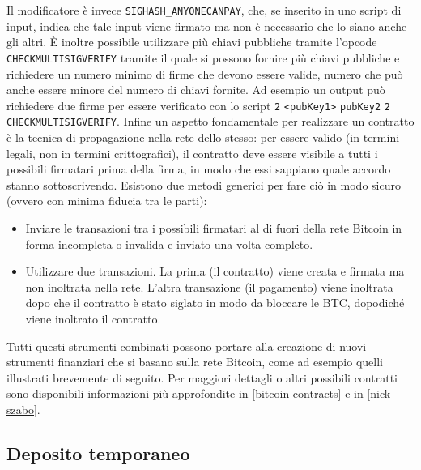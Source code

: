 Il modificatore è invece \verb|SIGHASH_ANYONECANPAY|, che, se inserito in uno script di input, indica che tale input viene firmato ma non è necessario che lo siano anche gli altri.
È inoltre possibile utilizzare più chiavi pubbliche tramite l'opcode \verb|CHECKMULTISIGVERIFY| tramite il quale si possono fornire più chiavi pubbliche e richiedere un numero minimo di firme che devono essere valide, numero che può anche essere minore del numero di chiavi fornite. Ad esempio un output può richiedere due firme per essere verificato con lo script \verb|2| \verb|<pubKey1>| \verb|pubKey2| \verb|2| \verb|CHECKMULTISIGVERIFY|.
Infine un aspetto fondamentale per realizzare un contratto è la tecnica di propagazione nella rete dello stesso: per essere valido (in termini legali, non in termini crittografici), il contratto deve essere visibile a tutti i possibili firmatari prima della firma, in modo che essi sappiano quale accordo stanno sottoscrivendo. Esistono due metodi generici per fare ciò in modo sicuro (ovvero con minima fiducia tra le parti):
\begin{itemize}
    \item Inviare le transazioni tra i possibili firmatari al di fuori della rete Bitcoin in forma incompleta o invalida e inviato una volta completo.
    \item Utilizzare due transazioni. La prima (il contratto) viene creata e firmata ma non inoltrata nella rete. L'altra transazione (il pagamento) viene inoltrata dopo che il contratto è stato siglato in modo da bloccare le BTC, dopodiché viene inoltrato il contratto.
\end{itemize}

Tutti questi strumenti combinati possono portare alla creazione di nuovi strumenti finanziari che si basano sulla rete Bitcoin, come ad esempio quelli illustrati brevemente di seguito. Per maggiori dettagli o altri possibili contratti sono disponibili informazioni più approfondite in \ref{bitcoin-contracts} e in \ref{nick-szabo}.

\subsection{Deposito temporaneo}

